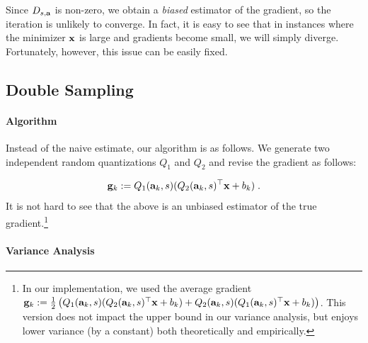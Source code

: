 \documentclass{article}
\def\a{{\bf a}}
\def\g{{\bf g}}
\def\x{{\bf x}}
\begin{document}
Since $D_{s, \a}$ is non-zero, we obtain a \emph{biased} estimator of the gradient, so the iteration is unlikely to converge. 
In fact, it is easy to see that in instances where the minimizer $\x$ is large and gradients become small, we will simply diverge. 
Fortunately, however, this issue can be easily fixed. 

\subsection{Double Sampling}

\paragraph{Algorithm}
Instead of the naive estimate, our algorithm is as follows.
We generate two independent
random quantizations $Q_1$
and $Q_2$ and revise the gradient as follows:


\[
\g_k := Q_1 (\a_k, s) (Q_2 (\a_k, s)^\top \x + b_k) \; .
\]
It is not hard to see that the above is an unbiased estimator of the true gradient.\footnote{In our implementation,
we used the average gradient $\g_k := \frac{1}{2}\left(Q_1 (\a_k, s) (Q_2 (\a_k, s)^\top \x + b_k) + 
Q_2 (\a_k, s) (Q_1 (\a_k, s)^\top \x + b_k)\right)$. This version does not impact  the upper bound in our variance analysis,
but enjoys lower variance (by a constant) both theoretically and empirically.}


\paragraph{Variance Analysis}
\end{document}
